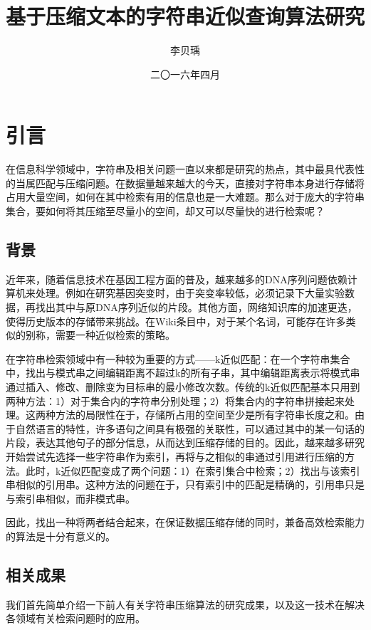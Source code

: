 ﻿\documentclass{sysuthesis}
\title{基于压缩文本的字符串近似查询算法研究}
\author{李贝瑀}
\date{二〇一六年四月}
\begin{document}
\frontmatter

\cleardoublepage
\tableofcontents

\mainmatter



\chapter{引言}
在信息科学领域中，字符串及相关问题一直以来都是研究的热点，其中最具代表性的当属匹配\cite{knuth1977fast}与压缩\cite{ziv1977universal}问题。在数据量越来越大的今天，直接对字符串本身进行存储将占用大量空间，如何在其中检索有用的信息也是一大难题。那么对于庞大的字符串集合，要如何将其压缩至尽量小的空间，却又可以尽量快的进行检索呢？



\section{背景}
近年来，随着信息技术在基因工程方面的普及，越来越多的DNA序列问题依赖计算机来处理。例如在研究基因突变时，由于突变率较低，必须记录下大量实验数据，再找出其中与原DNA序列近似的片段。其他方面，网络知识库的加速更迭，使得历史版本的存储带来挑战。在Wiki条目中，对于某个名词，可能存在许多类似的别称，需要一种近似检索的策略。\par
在字符串检索领域中有一种较为重要的方式——k近似匹配：在一个字符串集合中，找出与模式串之间编辑距离不超过k的所有子串，其中编辑距离表示将模式串通过插入、修改、删除变为目标串的最小修改次数。传统的k近似匹配基本只用到两种方法：1）对于集合内的字符串分别处理；2）将集合内的字符串拼接起来处理。这两种方法的局限性在于，存储所占用的空间至少是所有字符串长度之和。由于自然语言的特性，许多语句之间具有极强的关联性，可以通过其中的某一句话的片段，表达其他句子的部分信息，从而达到压缩存储的目的。因此，越来越多研究开始尝试先选择一些字符串作为索引，再将与之相似的串通过引用进行压缩的方法。此时，k近似匹配变成了两个问题：1）在索引集合中检索；2）找出与该索引串相似的引用串。这种方法的问题在于，只有索引中的匹配是精确的，引用串只是与索引串相似，而非模式串。\par
因此，找出一种将两者结合起来，在保证数据压缩存储的同时，兼备高效检索能力的算法是十分有意义的。



\section{相关成果}
我们首先简单介绍一下前人有关字符串压缩算法的研究成果，以及这一技术在解决各领域有关检索问题时的应用。
\end{document}
